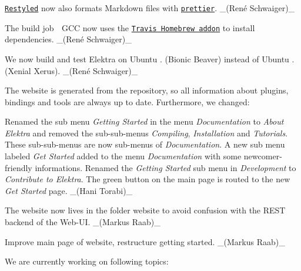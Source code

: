 \begin{DoxyItemize}
\item \href{https://restyled.io}{\tt Restyled} now also formats Markdown files with \href{https://prettier.io}{\tt {\ttfamily prettier}}. \+\_\+(René Schwaiger)\+\_\+
\end{DoxyItemize}


\begin{DoxyItemize}
\item The build job {\ttfamily 🍏 G\+CC} now uses the \href{https://docs.travis-ci.com/user/installing-dependencies/#installing-packages-on-macos}{\tt Travis Homebrew addon} to install dependencies. \+\_\+(René Schwaiger)\+\_\+
\item We now build and test Elektra on Ubuntu {.} (Bionic Beaver) instead of Ubuntu {.} (Xenial Xerus). \+\_\+(René Schwaiger)\+\_\+
\end{DoxyItemize}

The website is generated from the repository, so all information about plugins, bindings and tools are always up to date. Furthermore, we changed\+:


\begin{DoxyItemize}
\item Renamed the sub menu {\itshape Getting Started} in the menu {\itshape Documentation} to {\itshape About Elektra} and removed the sub-\/sub-\/menus {\itshape Compiling}, {\itshape Installation} and {\itshape Tutorials}. These sub-\/sub-\/menus are now sub-\/menus of {\itshape Documentation}. A new sub menu labeled {\itshape Get Started} added to the menu {\itshape Documentation} with some newcomer-\/friendly informations. Renamed the {\itshape Getting Started} sub menu in {\itshape Development} to {\itshape Contribute to Elektra}. The green button on the main page is routed to the new {\itshape Get Started} page. \+\_\+(\+Hani Torabi)\+\_\+
\item The website now lives in the folder website to avoid confusion with the R\+E\+ST backend of the Web-\/\+UI. \+\_\+(\+Markus Raab)\+\_\+
\item Improve main page of website, restructure getting started. \+\_\+(\+Markus Raab)\+\_\+
\end{DoxyItemize}

We are currently working on following topics\+:


